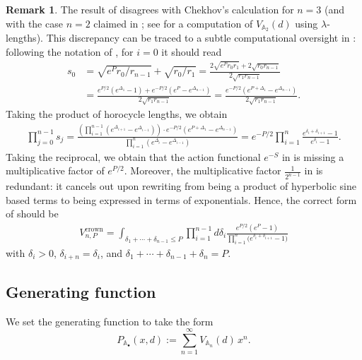 \documentclass{amsart}
\renewcommand{\AA}{\mathbb{A}}
\theoremstyle{definition}
\newtheorem{remark}[proposition]{Remark}
\begin{document}
\begin{remark}\label{rmk:chekhoverror}
The result of  disagrees with Chekhov's calculation for $n = 3$ \cite[Example~2.5.1]{chekhov2024} (and with the case $n=2$ claimed in \cite[Lemma~2.6]{chekhov2024}; see  for a computation of $V_{\AA_2}(d)$ using $\lambda$-lengths). This discrepancy can be traced to a subtle computational oversight in \cite[Equation~2.4]{chekhov2024}: following the notation of \cite{chekhov2024}, for $i=0$ it should read
\begin{align*}
s_0 &= \sqrt{e^P r_0/r_{n-1}} + \sqrt{r_0/r_1} = \frac{2\sqrt{e^{P}r_0r_1}+2\sqrt{r_0r_{n-1}}}{2\sqrt{r_1r_{n-1}}}
\\&= \frac{e^{P/2}(e^{\Delta_1}-1)+e^{-P/2}(e^P-e^{\Delta_{n-1}})}{2\sqrt{r_1r_{n-1}}}
=\frac{e^{-P/2}(e^{P+\Delta_1}-e^{\Delta_{n-1}})}{2\sqrt{r_1r_{n-1}}}.
\end{align*}
Taking the product of horocycle lengths, we obtain
\begin{align*}
\prod_{j=0}^{n-1} s_j = \frac{\left(\prod_{i=1}^{n-1}(e^{\Delta_{i+1}}-e^{\Delta_{i-1}})\right)\cdot e^{-P/2}(e^{P+\Delta_1}-e^{\Delta_{n-1}}) }{\prod_{i=1}^n(e^{\Delta_{i}}-e^{\Delta_{i-1}})}  = e^{-P/2} \prod_{i=1}^n\frac{e^{\delta_i+\delta_{i+1}}-1}{e^{\delta_i}-1}.
\end{align*}
Taking the reciprocal, we obtain that the action functional $e^{-S}$ in \cite[Theorem~2.4]{chekhov2024} is missing a multiplicative factor of $e^{P/2}$. Moreover, the multiplicative factor $\frac{1}{2^{n-1}}$ in \cite[Theorem~2.4]{chekhov2024} is redundant: it cancels out upon rewriting \cite[Equation~2.9]{chekhov2024} from being a product of hyperbolic sine based terms to being expressed in terms of exponentials. Hence, the correct form of \cite[Theorem 2.4]{chekhov2024} should be
\begin{align*}
V^{\text{crown}}_{n,P}= \int_{\delta_1+\cdots +\delta_{n-1}\le P} \prod_{i=1}^{n-1}d\delta_i \frac{e^{P/2}(e^P-1)}{\prod_{i=1}^n \bigl( e^{\delta_i+\delta_{i+1}}-1 \bigr)}
\end{align*}
with $\delta_i>0$, $\delta_{i+n}=\delta_i$, and $\delta_1+\cdots +\delta_{n-1}+\delta_n=P$. 

\end{remark}








\subsection{Generating function}
We set the generating function to take the form
\[
P_{\mathbb{A}_{\bullet}}(x,d):=\sum_{n=1}^\infty V_{\mathbb{A}_n}(d)\,x^{n}.
\]
\end{document}
